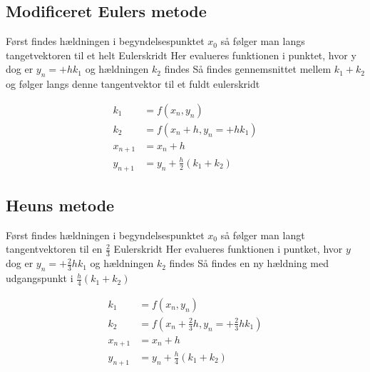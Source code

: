 %
\subsection*{Modificeret Eulers metode}

Først findes hældningen i begyndelsespunktet $x_0$ 
så følger man langs tangetvektoren til et helt Eulerskridt
Her evalueres funktionen i punktet, hvor y dog er $y_n = + h k_1$ og hældningen $k_2$ findes 
Så findes gennemsnittet mellem $k_1 + k_2$ og følger langs denne tangentvektor til et fuldt eulerskridt 


%
\begin{align*}
k_1 & = f(x_n , y_n) \\
k_2 & = f(x_n + h , y_n = + h k_1 ) \\
x_{n+1} & = x_n+h \\
y_{n+1} & = y_n + \frac{h}{2} (k_1 + k_2 )
\end{align*}
% 


\subsection*{Heuns metode}
Først findes hældningen i begyndelsespunktet $x_0$ 
så følger man langt tangentvektoren til en $\frac{2}{3}$ Eulerskridt 
Her evalueres funktionen i puntket, hvor $y$ dog er $y_n = + \frac{2}{3} h k_1$ og hældningen $k_2$ findes 
Så findes en ny hældning med udgangspunkt i 
$\frac{h}{4} (k_1 + k_2 ) $ 

%
\begin{align*}
k_1 & = f(x_n , y_n) \\
k_2 & = f(x_n + \frac{2}{3} h , y_n = + \frac{2}{3} h k_1 ) \\
x_{n+1} & = x_n+h \\
y_{n+1} & = y_n + \frac{h}{4} (k_1 + k_2 )
\end{align*}


